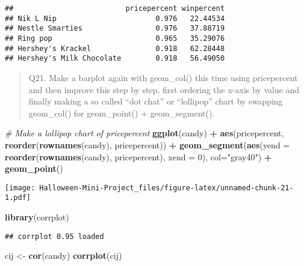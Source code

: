 \documentclass[
]{article}
\newenvironment{Shaded}{\begin{snugshade}}{\end{snugshade}}
\newcommand{\AttributeTok}[1]{\textcolor[rgb]{0.13,0.29,0.53}{#1}}
\newcommand{\CommentTok}[1]{\textcolor[rgb]{0.56,0.35,0.01}{\textit{#1}}}
\newcommand{\DecValTok}[1]{\textcolor[rgb]{0.00,0.00,0.81}{#1}}
\newcommand{\FunctionTok}[1]{\textcolor[rgb]{0.13,0.29,0.53}{\textbf{#1}}}
\newcommand{\NormalTok}[1]{#1}
\newcommand{\OtherTok}[1]{\textcolor[rgb]{0.56,0.35,0.01}{#1}}
\newcommand{\SpecialCharTok}[1]{\textcolor[rgb]{0.81,0.36,0.00}{\textbf{#1}}}
\newcommand{\StringTok}[1]{\textcolor[rgb]{0.31,0.60,0.02}{#1}}
\begin{document}
\begin{verbatim}
##                          pricepercent winpercent
## Nik L Nip                       0.976   22.44534
## Nestle Smarties                 0.976   37.88719
## Ring pop                        0.965   35.29076
## Hershey's Krackel               0.918   62.28448
## Hershey's Milk Chocolate        0.918   56.49050
\end{verbatim}

\begin{quote}
Q21. Make a barplot again with geom\_col() this time using pricepercent
and then improve this step by step, first ordering the x-axis by value
and finally making a so called ``dot chat'' or ``lollipop'' chart by
swapping geom\_col() for geom\_point() + geom\_segment().
\end{quote}

\begin{Shaded}
\begin{Highlighting}[]
\CommentTok{\# Make a lollipop chart of pricepercent}
\FunctionTok{ggplot}\NormalTok{(candy) }\SpecialCharTok{+}
  \FunctionTok{aes}\NormalTok{(pricepercent, }\FunctionTok{reorder}\NormalTok{(}\FunctionTok{rownames}\NormalTok{(candy), pricepercent)) }\SpecialCharTok{+}
  \FunctionTok{geom\_segment}\NormalTok{(}\FunctionTok{aes}\NormalTok{(}\AttributeTok{yend =} \FunctionTok{reorder}\NormalTok{(}\FunctionTok{rownames}\NormalTok{(candy), pricepercent), }
                   \AttributeTok{xend =} \DecValTok{0}\NormalTok{), }\AttributeTok{col=}\StringTok{"gray40"}\NormalTok{) }\SpecialCharTok{+}
    \FunctionTok{geom\_point}\NormalTok{()}
\end{Highlighting}
\end{Shaded}

\texttt{[image: Halloween-Mini-Project\_files/figure-latex/unnamed-chunk-21-1.pdf]}

\begin{Shaded}
\begin{Highlighting}[]
\FunctionTok{library}\NormalTok{(corrplot)}
\end{Highlighting}
\end{Shaded}

\begin{verbatim}
## corrplot 0.95 loaded
\end{verbatim}

\begin{Shaded}
\begin{Highlighting}[]
\NormalTok{cij }\OtherTok{\textless{}{-}} \FunctionTok{cor}\NormalTok{(candy)}
\FunctionTok{corrplot}\NormalTok{(cij)}
\end{Highlighting}
\end{Shaded}
\end{document}
